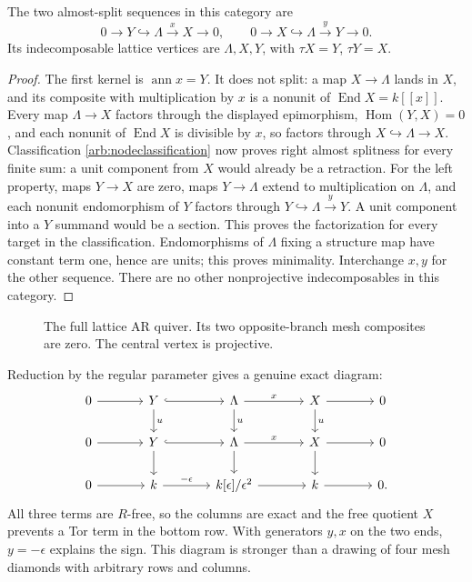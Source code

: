 \begin{theorem}\label{arb:nodear}
The two almost-split sequences in this category are
\[
 0\to Y\hookrightarrow\Lambda\xrightarrow{x}X\to0,
 \qquad0\to X\hookrightarrow\Lambda\xrightarrow{y}Y\to0.
\]
Its indecomposable lattice vertices are $\Lambda,X,Y$, with $\tau X=Y$, $\tau Y=X$.
\end{theorem}
\begin{proof}
The first kernel is $\operatorname{ann}x=Y$. It does not split: a map
$X\to\Lambda$ lands in $X$, and its composite with multiplication by $x$
is a nonunit of $\operatorname{End}X=k[[x]]$. Every map $\Lambda\to X$
factors through the displayed epimorphism, $\operatorname{Hom}(Y,X)=0$,
and each nonunit of $\operatorname{End}X$ is divisible by $x$, so factors
through $X\hookrightarrow\Lambda\to X$. Classification
\eqref{arb:nodeclassification} now proves right almost splitness for every
finite sum: a unit component from $X$ would already be a retraction.
For the left property, maps $Y\to X$ are zero, maps $Y\to\Lambda$
extend to multiplication on $\Lambda$, and each nonunit endomorphism of
$Y$ factors through $Y\hookrightarrow\Lambda\xrightarrow{y}Y$.
A unit component into a $Y$ summand would be a section. This proves the
factorization for every target in the classification. Endomorphisms of
$\Lambda$ fixing a structure map have constant term one, hence are units;
this proves minimality.
Interchange $x,y$ for the other sequence. There are no other nonprojective
indecomposables in this category.
\end{proof}

\begin{figure}[htbp]\centering
{}
\caption{The full lattice AR quiver. Its two opposite-branch mesh composites
are zero. The central vertex is projective.}
\end{figure}

Reduction by the regular parameter gives a genuine exact diagram:
\[
\begin{tikzcd}[column sep=large]
0\arrow[r]&Y\arrow[r,hook]\arrow[d,"u"]&\Lambda\arrow[r,"x"]\arrow[d,"u"]&X\arrow[r]\arrow[d,"u"]&0\\
0\arrow[r]&Y\arrow[r,hook]\arrow[d]&\Lambda\arrow[r,"x"]\arrow[d]&X\arrow[r]\arrow[d]&0\\
0\arrow[r]&k\arrow[r,"-\epsilon"]&k[\epsilon]/\epsilon^2\arrow[r]&k\arrow[r]&0 .
\end{tikzcd}
\]
All three terms are $R$-free, so the columns are exact and the free quotient
$X$ prevents a Tor term in the bottom row. With generators $y,x$ on the two
ends, $y=-\epsilon$ explains the sign. This diagram is stronger than a drawing
of four mesh diamonds with arbitrary rows and columns.

